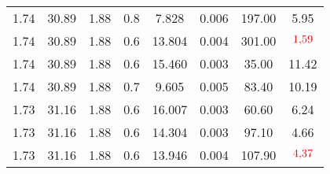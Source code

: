\begin{table}[H]
\begin{tabular}{S S S S S S S S }
1.74  & 30.89  & 1.88  & 0.8  & 7.828  & 0.006  & 197.00  & 5.95\\
1.74  & 30.89  & 1.88  & 0.6  & 13.804  & 0.004  & 301.00  & $\textcolor{red}{\num{1.59}}$\\
1.74  & 30.89  & 1.88  & 0.6  & 15.460  & 0.003  & 35.00  & 11.42\\
1.74  & 30.89  & 1.88  & 0.7  & 9.605  & 0.005  & 83.40  & 10.19\\
1.73  & 31.16  & 1.88  & 0.6  & 16.007  & 0.003  & 60.60  & 6.24\\
1.73  & 31.16  & 1.88  & 0.6  & 14.304  & 0.003  & 97.10  & 4.66\\
1.73  & 31.16  & 1.88  & 0.6  & 13.946  & 0.004  & 107.90  & $\textcolor{red}{\num{4.37}}$\\
\bottomrule
\end{tabular}
\end{table}
